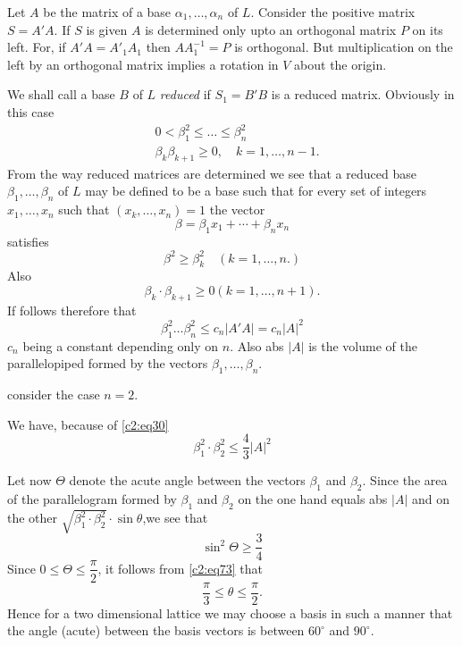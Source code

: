 Let $A$ be the matrix of a base $\alpha_{1},\ldots,\alpha_{n}$ of
$L$. Consider the positive matrix $S=A'A$. If $S$ is given $A$ is
determined only upto an orthogonal matrix $P$ on its left. For, if
$A'A=A'_{1}A_{1}$ then $AA^{-1}_{1}=P$ is orthogonal. But
multiplication on the left by an orthogonal matrix implies a rotation
in $V$ about the origin.

We shall call a base $B$ of $L$ {\em reduced} if $S_{1}=B'B$ is a
reduced matrix. Obviously in this case 
\begin{align*}
& 0<\beta^{2}_{1}\leq\ldots\leq \beta^{2}_{n}\\
& \beta_{k}\beta_{k+1}\geq 0,\quad k=1,\ldots,n-1.
\end{align*}\pageoriginale
From the way reduced matrices are determined we see that a reduced
base $\beta_{1},\ldots,\beta_{n}$ of $L$ may be defined to be a base
such that for every set of integers $x_{1},\ldots,x_{n}$ such that
$(x_{k},\ldots,x_{n})=1$ the vector
$$
\beta=\beta_{1}x_{1}+\cdots+\beta_{n}x_{n}
$$
satisfies
$$
\beta^{2}\geq \beta^{2}_{k}\quad (k=1,\ldots,n.)
$$
Also 
$$
\beta_{k}\cdot \beta_{k+1}\geq 0(k=1,\ldots,n+1).
$$
If follows therefore that
$$
\beta^{2}_{1}\ldots\beta^{2}_{n}\leq c_{n}|A'A|=c_{n}|A|^{2}
$$
$c_{n}$ being a constant depending only on $n$. Also abs $|A|$ is the
volume of the parallelopiped formed by the vectors
$\beta_{1},\ldots,\beta_{n}$. 

consider the case $n=2$.

We have, because of \eqref{c2:eq30}
\begin{equation*}
\beta^{2}_{1}\cdot \beta^{2}_{2}\leq \frac{4}{3}|A|^{2}\tag{72}\label{c2:eq72}
\end{equation*}

Let now $\Theta$ denote the acute angle between the vectors
$\beta_{1}$ and $\beta_{2}$. Since the area of the parallelogram
formed by $\beta_{1}$ and $\beta_{2}$ on the one hand equals abs $|A|$
and on the other $\sqrt{\beta^{2}_{1}\cdot \beta^{2}_{2}}\cdot
\sin\theta$,\pageoriginale we see that
\begin{equation*}
\sin^{2}\Theta\geq \frac{3}{4}\tag{73}\label{c2:eq73}
\end{equation*}
Since $0\leq \Theta \leq \dfrac{\pi}{2}$, it follows from \eqref{c2:eq73}
that 
$$
\frac{\pi}{3}\leq \theta\leq \frac{\pi}{2}.
$$
Hence for a two dimensional lattice we may choose a basis in such a
manner that the angle (acute) between the basis vectors is between
$60^{\circ}$ and $90^{\circ}$.


